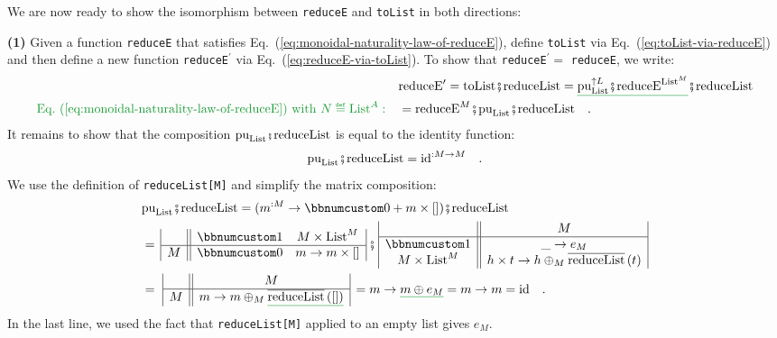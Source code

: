 We are now ready to show the isomorphism between \lstinline!reduceE!
and \lstinline!toList! in both directions:

\textbf{(1)} Given a function \lstinline!reduceE! that satisfies
Eq.~(\ref{eq:monoidal-naturality-law-of-reduceE}), define \lstinline!toList!
via Eq.~(\ref{eq:toList-via-reduceE}) and then define a new function
\lstinline!reduceE!$^{\prime}$ via Eq.~(\ref{eq:reduceE-via-toList}).
To show that \lstinline!reduceE!$^{\prime}=$ \lstinline!reduceE!,
we write:
\begin{align*}
 & \text{reduceE}^{\prime}=\text{toList}\bef\text{reduceList}=\gunderline{\text{pu}_{\text{List}}^{\uparrow L}\bef\text{reduceE}^{\text{List}^{M}}}\bef\text{reduceList}\\
{\color{greenunder}\text{Eq.~(\ref{eq:monoidal-naturality-law-of-reduceE}) with }N\triangleq\text{List}^{A}:}\quad & =\text{reduceE}^{M}\bef\text{pu}_{\text{List}}\bef\text{reduceList}\quad.
\end{align*}
It remains to show that the composition $\text{pu}_{\text{List}}\bef\text{reduceList}$
is equal to the identity function:
\[
\text{pu}_{\text{List}}\bef\text{reduceList}=\text{id}^{:M\rightarrow M}\quad.
\]
We use the definition of \lstinline!reduceList[M]! and simplify the
matrix composition:
\begin{align*}
 & \text{pu}_{\text{List}}\bef\text{reduceList}=(m^{:M}\rightarrow\bbnum 0+m\times\left[\right])\bef\text{reduceList}\\
 & =\,\begin{array}{|c||cc|}
 & \bbnum 1 & M\times\text{List}^{M}\\
\hline M & \bbnum 0 & m\rightarrow m\times\left[\right]
\end{array}\,\bef\,\begin{array}{|c||c|}
 & M\\
\hline \bbnum 1 & \_\rightarrow e_{M}\\
M\times\text{List}^{M} & h\times t\rightarrow h\oplus_{M}\overline{\text{reduceList}}\left(t\right)
\end{array}\\
 & =\,\,\begin{array}{|c||c|}
 & M\\
\hline M & m\rightarrow m\oplus_{M}\gunderline{\overline{\text{reduceList}}\left(\left[\right]\right)}
\end{array}\,=m\rightarrow\gunderline{m\oplus e_{M}}=m\rightarrow m=\text{id}\quad.
\end{align*}
In the last line, we used the fact that \lstinline!reduceList[M]!
applied to an empty list gives $e_{M}$.

